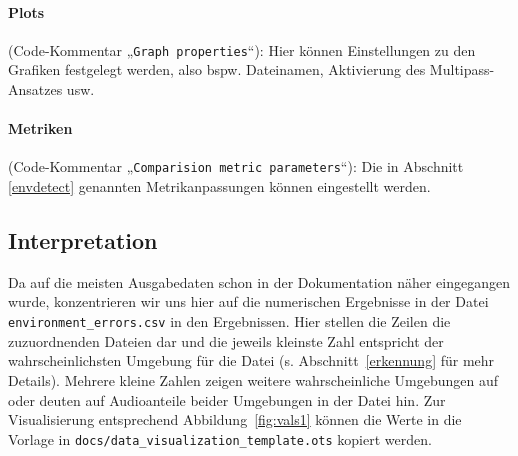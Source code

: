 \documentclass[
	fontsize=10.5pt,
	marginpar=false,
	ngerman,
	accentcolor=3d
	]{tudapub}
\begin{document}
\paragraph{Plots} (Code-Kommentar „\texttt{Graph properties}“): Hier können Einstellungen zu den Grafiken festgelegt werden, also bspw. Dateinamen, Aktivierung des Multipass-Ansatzes usw.

\paragraph{Metriken} (Code-Kommentar „\texttt{Comparision metric parameters}“): Die in Abschnitt \ref{envdetect} genannten Metrikanpassungen können eingestellt werden.

\subsection{Interpretation} 

Da auf die meisten Ausgabedaten schon in der Dokumentation näher eingegangen wurde, konzentrieren wir uns hier auf die numerischen Ergebnisse in der Datei \texttt{environment\_errors.csv} in den Ergebnissen. Hier stellen die Zeilen die zuzuordnenden Dateien dar und die jeweils kleinste Zahl entspricht der wahrscheinlichsten Umgebung für die Datei (s. Abschnitt~\ref{erkennung} für mehr Details). Mehrere kleine Zahlen zeigen weitere wahrscheinliche Umgebungen auf oder deuten auf Audioanteile beider Umgebungen in der Datei hin. Zur Visualisierung entsprechend Abbildung~\ref{fig:vals1} können die Werte in die Vorlage in \texttt{docs/data\_visualization\_template.ots} kopiert werden.

\appendix




\pagebreak
\printbibliography


\end{document}

